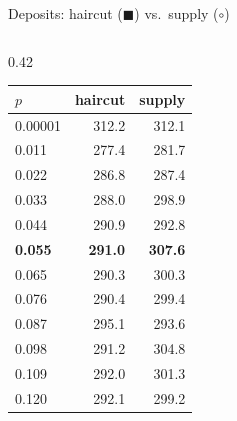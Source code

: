 \documentclass[aspectratio=169,10pt]{beamer}
\begin{document}
\begin{frame}{Deposits: haircut ($\blacksquare$) vs.\ supply ($\circ$)}
\begin{columns}[T]
\begin{column}{0.42\textwidth}
\begin{tabular}{lrr}
        \toprule
        $p$ & haircut & supply \\
        \midrule
        0.00001 & 312.2 & 312.1 \\
        0.011 & 277.4 & 281.7 \\
        0.022 & 286.8 & 287.4 \\
        0.033 & 288.0 & 298.9 \\
        0.044 & 290.9 & 292.8 \\
        \textbf{0.055} & \textbf{291.0} & \textbf{307.6} \\
        0.065 & 290.3 & 300.3 \\
        0.076 & 290.4 & 299.4 \\
        0.087 & 295.1 & 293.6 \\
        0.098 & 291.2 & 304.8 \\
        0.109 & 292.0 & 301.3 \\
        0.120 & 292.1 & 299.2 \\
        \bottomrule
      \end{tabular}
    \end{column}
  \end{columns}
\end{frame}
\end{document}
